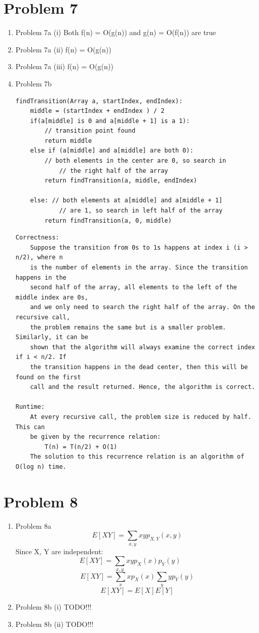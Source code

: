 \documentclass[11pt]{article}
\newcommand{\solution}[1]{{{\color{blue}{\bf Solution:} {#1}}}}
\begin{document}
\section{Problem 7}
\begin{enumerate}
\item Problem 7a (i)
\solution{}
Both f(n) = O(g(n)) and g(n) = O(f(n)) are true

\item Problem 7a (ii)
\solution{}
f(n) = O(g(n))

\item Problem 7a (iii)
\solution{}
f(n) = O(g(n))

\item Problem 7b
\solution{}
\begin{lstlisting}
findTransition(Array a, startIndex, endIndex):
	middle = (startIndex + endIndex ) / 2
	if(a[middle] is 0 and a[middle + 1] is a 1):
		// transition point found
		return middle
	else if (a[middle] and a[middle] are both 0):
		// both elements in the center are 0, so search in 
			// the right half of the array
		return findTransition(a, middle, endIndex)
		
	else: // both elements at a[middle] and a[middle + 1] 
			// are 1, so search in left half of the array
		return findTransition(a, 0, middle)
\end{lstlisting}
\begin{verbatim}		
Correctness:
	Suppose the transition from 0s to 1s happens at index i (i > n/2), where n 
	is the number of elements in the array. Since the transition happens in the 
	second half of the array, all elements to the left of the middle index are 0s, 
	and we only need to search the right half of the array. On the recursive call, 
	the problem remains the same but is a smaller problem. Similarly, it can be 
	shown that the algorithm will always examine the correct index if i < n/2. If 
	the transition happens in the dead center, then this will be found on the first
	call and the result returned. Hence, the algorithm is correct.

Runtime:
	At every recursive call, the problem size is reduced by half. This can 
	be given by the recurrence relation:
		T(n) = T(n/2) + O(1)
	The solution to this recurrence relation is an algorithm of O(log n) time. 
\end{verbatim}



\end{enumerate}

\newpage
\section{Problem 8}
\begin{enumerate}
\item Problem 8a
\solution{}
$$
	E[XY] = \sum_{x,y} xy p_{X,Y}(x,y)
$$
Since X, Y are independent: 
$$
	E[XY] = \sum_{x,y} xy p_{X}(x) p_{Y}(y) \qquad $$
$$
	E[XY] = \sum_{x} x p_{X}(x) \sum_{y} y p_{Y}(y)
$$
$$
	E[XY] = E[X]E[Y]
$$

\item Problem 8b (i)
\solution{}
TODO!!!
\item Problem 8b (ii)
\solution{}
TODO!!!
\end{enumerate}
\end{document}
